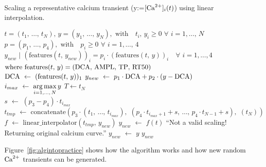 \begin{algorithm}[ht!]
    \caption{Scaling a representative calcium transient (y:=$[\textrm{Ca}^{2+}]_{i}(t)$) using linear interpolation.}\label{alg:cascaling}
    \begin{algorithmic} 
    \REQUIRE $t=(t_1,\,\dots,\,t_N),\,y=(y_1,\,\dots,\,y_N),\,\,\textrm{with}\quad t_i,\,y_i\ge 0\,\,\forall\,\,i=1,\dots,\,N$ \\ $p=(p_1,\,\dots,\,p_4),\,\,\textrm{with}\quad p_i\ge 0\,\,\forall\,\,i=1,\dots,\,4$
    \ENSURE $y_{new}\,\,|\,\,(\textrm{features}(t,\,y_{new}))_{i} = p_i\cdot(\textrm{features}(t,\,y))_{i}\quad\forall\,\,i=1,\dots,4$ \\ $\textrm{where}\,\,\textrm{features}(t,\,y) = (\textrm{DCA},\,\textrm{AMPL},\,\textrm{TP},\,\textrm{RT50})$ \\ \vspace{0.2cm}
    \STATE $\textrm{DCA}\,\,\leftarrow\,\,(\textrm{features}(t,\,y))_1$
    \STATE $y_{new}\,\,\leftarrow\,\,p_1\cdot\textrm{DCA} + p_2\cdot(y-\textrm{DCA})$
    \STATE $i_{max}\,\,\leftarrow\,\,\operatorname*{arg\,max}\limits_{i=1,\dots,\,N}{y}$
    \STATE $T \leftarrow t_{N}$ \\
    \vspace{0.2cm}
    \STATE $s\,\,\leftarrow\,\,(p_3 - p_4)\cdot t_{i_{max}}$
    \STATE $t_{tmp}\,\,\leftarrow\,\,\textrm{concatenate}(p_3\cdot (t_{1},\,\dots,\,t_{i_{max}}),\,\,(p_4\cdot t_{i_{max}+1}+s,\,\dots,\,p_4\cdot t_{N-1}+s),\,\,(t_{N}))$
    \STATE $f\,\,\leftarrow\,\,\textrm{linear\_interpolator}(t_{tmp},\, y_{new})$
    \STATE $y_{new}\,\,\leftarrow\,\,f(t)$
    \ELSE
    \PRINT ``Not a valid scaling! Returning original calcium curve.''
    \STATE $y_{new}\,\,\leftarrow\,\,y$
    \ENDIF
    \RETURN $y_{new}$
    \end{algorithmic}
    \label{alg:caalg}
\end{algorithm}

\vspace{0.2cm}\noindent
Figure~\ref{fig:algintopractice} shows how the algorithm works and how new random $\textrm{Ca}^{2+}$ transients can be generated.

